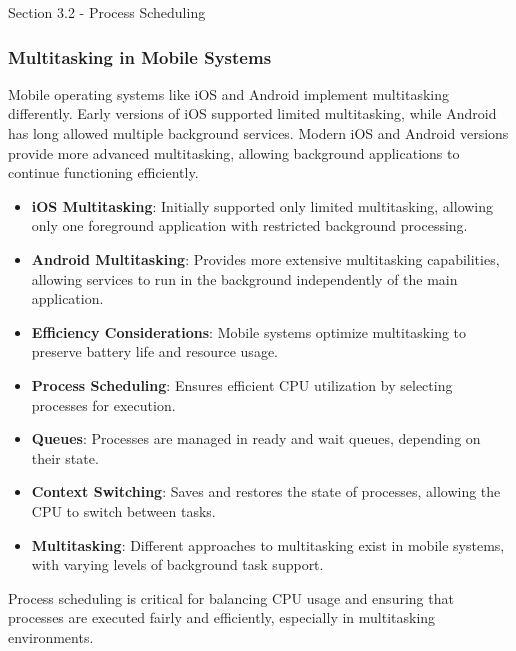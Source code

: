 \begin{notes}{Section 3.2 - Process Scheduling}
\begin{highlight}
    \end{highlight}
    
    \subsubsection*{Multitasking in Mobile Systems}
    
    Mobile operating systems like iOS and Android implement multitasking differently. Early versions of iOS supported limited multitasking, while Android has long allowed multiple background services.
    Modern iOS and Android versions provide more advanced multitasking, allowing background applications to continue functioning efficiently.
    
    \begin{highlight}
    
        \begin{itemize}
            \item \textbf{iOS Multitasking}: Initially supported only limited multitasking, allowing only one foreground application with restricted background processing.
            \item \textbf{Android Multitasking}: Provides more extensive multitasking capabilities, allowing services to run in the background independently of the main application.
            \item \textbf{Efficiency Considerations}: Mobile systems optimize multitasking to preserve battery life and resource usage.
        \end{itemize}
    
    \end{highlight}
    
    \begin{highlight}
    
        \begin{itemize}
            \item \textbf{Process Scheduling}: Ensures efficient CPU utilization by selecting processes for execution.
            \item \textbf{Queues}: Processes are managed in ready and wait queues, depending on their state.
            \item \textbf{Context Switching}: Saves and restores the state of processes, allowing the CPU to switch between tasks.
            \item \textbf{Multitasking}: Different approaches to multitasking exist in mobile systems, with varying levels of background task support.
        \end{itemize}
    
    Process scheduling is critical for balancing CPU usage and ensuring that processes are executed fairly and efficiently, especially in multitasking environments.
    
    \end{highlight}
\end{notes}

